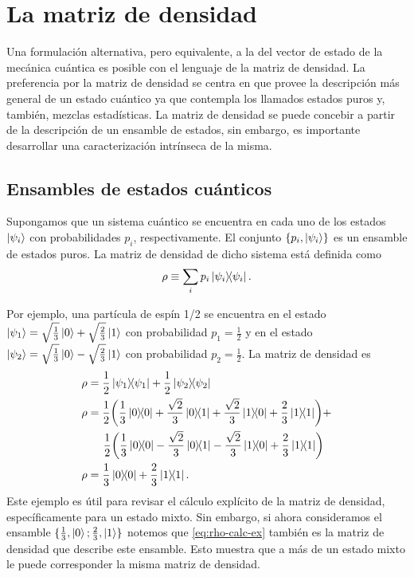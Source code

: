 \chapter{La matriz de densidad} %
Una formulación alternativa, pero equivalente, a la del vector de estado 
de la mecánica cuántica es posible con el lenguaje de la matriz de densidad. 
La preferencia por la matriz de densidad se centra en que provee la descripción
más general de un estado cuántico ya que contempla los llamados estados puros y,
también, mezclas estadísticas. La matriz de densidad se puede concebir 
a partir de la descripción de un ensamble de estados, sin embargo, es
importante desarrollar una caracterización intrínseca  de la misma. 

\section{Ensambles de estados cuánticos} %
Supongamos que un sistema cuántico se encuentra en cada uno de los estados 
$\ket{\psi _i}$ con probabilidades $p_i$, respectivamente. El conjunto 
$\{p_i,\ket{\psi _i} \}$ es un ensamble de estados puros. La matriz de 
densidad de dicho sistema está definida como
\begin{equation}
	\rho \equiv \sum _i p_i\dyad{\psi_i}{\psi_i}.
	\label{eq:rho_def}
\end{equation}

Por ejemplo, una partícula de espín 1/2 se encuentra en el estado 
$\ket{\psi_1}=\sqrt{\frac{1}{3}}\ket{0} + \sqrt{\frac{2}{3}}\ket{1}$
con probabilidad $p_1=\frac{1}{2}$ y en el estado 
$\ket{\psi_2}=\sqrt{\frac{1}{3}}\ket{0} - \sqrt{\frac{2}{3}}\ket{1}$
con probabilidad $p_2=\frac{1}{2}$. La matriz de densidad es
\begin{align}
	\rho 	&= \frac{1}{2}\dyad{\psi_1}{\psi_1} + 
	\frac{1}{2}\dyad{\psi_2}{\psi_2} \nonumber \\
	\rho	&= \frac{1}{2}\qty(\frac{1}{3}\dyad{0}{0} +
					 \frac{\sqrt{2}}{3}\dyad{0}{1} + 
					 \frac{\sqrt{2}}{3}\dyad{1}{0} +
					 \frac{2}{3}\dyad{1}{1}) + \nonumber \\
				&\hspace{5mm} \frac{1}{2}\qty(\frac{1}{3}\dyad{0}{0} -
					 \frac{\sqrt{2}}{3}\dyad{0}{1} -
					 \frac{\sqrt{2}}{3}\dyad{1}{0} +
					 \frac{2}{3}\dyad{1}{1}) \nonumber \\
	\rho	&= \frac{1}{3}\dyad{0}{0} + \frac{2}{3}\dyad{1}{1}. 
	\label{eq:rho-calc-ex}
\end{align}
Este ejemplo es útil para revisar el cálculo explícito de
la matriz de densidad, específicamente para un estado mixto. Sin
embargo, si ahora consideramos el ensamble $\{ \frac{1}{3}, \ket{0};
\frac{2}{3}, \ket{1} \}$ notemos que \eqref{eq:rho-calc-ex} también es la
matriz de densidad que describe este ensamble. Esto muestra que a más de un
estado mixto le puede corresponder la misma matriz de densidad.\newline

